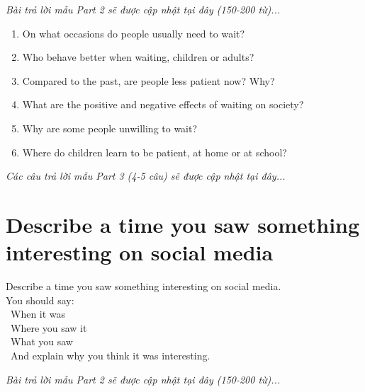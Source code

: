 \vspace{1em}
\textit{Bài trả lời mẫu Part 2 sẽ được cập nhật tại đây (150-200 từ)...}
\vspace{2em}

\begin{ieltsprompt}
\begin{enumerate}[itemsep=4pt]
    \item On what occasions do people usually need to wait?
    \item Who behave better when waiting, children or adults?
    \item Compared to the past, are people less patient now? Why?
    \item What are the positive and negative effects of waiting on society?
    \item Why are some people unwilling to wait?
    \item Where do children learn to be patient, at home or at school?
\end{enumerate}
\end{ieltsprompt}

\vspace{1em}
\textit{Các câu trả lời mẫu Part 3 (4-5 câu) sẽ được cập nhật tại đây...}
\vspace{2em}

\section{Describe a time you saw something interesting on social media}
\begin{ieltsprompt}
Describe a time you saw something interesting on social media. \\
You should say: \\
\textbullet\ When it was \\
\textbullet\ Where you saw it \\
\textbullet\ What you saw \\
\textbullet\ And explain why you think it was interesting. \\
\end{ieltsprompt}

\vspace{1em}
\textit{Bài trả lời mẫu Part 2 sẽ được cập nhật tại đây (150-200 từ)...}
\vspace{2em}

